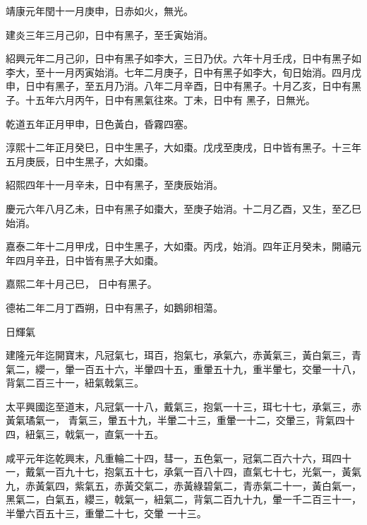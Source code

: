 \begin{pinyinscope}
 靖康元年閏十一月庚申，日赤如火，無光。



 建炎三年三月己卯，日中有黑子，至壬寅始消。



 紹興元年二月己卯，日中有黑子如李大，三日乃伏。六年十月壬戌，日中有黑子如李大，至十一月丙寅始消。七年二月庚子，日中有黑子如李大，旬日始消。四月戊申，日中有黑子，至五月乃消。八年二月辛酉，日中有黑子。十月乙亥，日中有黑子。十五年六月丙午，日中有黑氣往來。丁未，日中有
 黑子，日無光。



 乾道五年正月甲申，日色黃白，昏霧四塞。



 淳熙十二年正月癸巳，日中生黑子，大如棗。戊戌至庚戌，日中皆有黑子。十三年五月庚辰，日中生黑子，大如棗。



 紹熙四年十一月辛未，日中有黑子，至庚辰始消。



 慶元六年八月乙未，日中有黑子如棗大，至庚子始消。十二月乙酉，又生，至乙巳始消。



 嘉泰二年十二月甲戌，日中生黑子，大如棗。丙戌，始消。四年正月癸未，開禧元年四月辛丑，日中皆有黑子大如棗。



 嘉熙二年十月己巳，
 日中有黑子。



 德祐二年二月丁酉朔，日中有黑子，如鵝卵相蕩。



 日輝氣



 建隆元年迄開寶末，凡冠氣七，珥百，抱氣七，承氣六，赤黃氣三，黃白氣三，青氣二，纓一，暈一百五十六，半暈四十五，重暈五十九，重半暈七，交暈一十八，背氣二百三十一，紐氣戟氣三。



 太平興國迄至道末，凡冠氣一十八，戴氣三，抱氣一十三，珥七十七，承氣三，赤黃氣璚氣一，
 青氣三，暈五十九，半暈二十三，重暈一十二，交暈三，背氣四十四，紐氣三，戟氣一，直氣一十五。



 咸平元年迄乾興末，凡重輪二十四，彗一，五色氣一，冠氣二百六十六，珥四十一，戴氣一百九十七，抱氣五十七，承氣一百八十四，直氣七十七，光氣一，黃氣九，赤黃氣四，紫氣五，赤黃交氣二，赤黃綠碧氣二，青赤氣二十一，黃白氣一，黑氣二，白氣五，纓三，戟氣一，紐氣二，背氣二百九十九，暈一千二百三十一，半暈六百五十三，重暈二十七，交暈
 一十三。




\end{pinyinscope}
